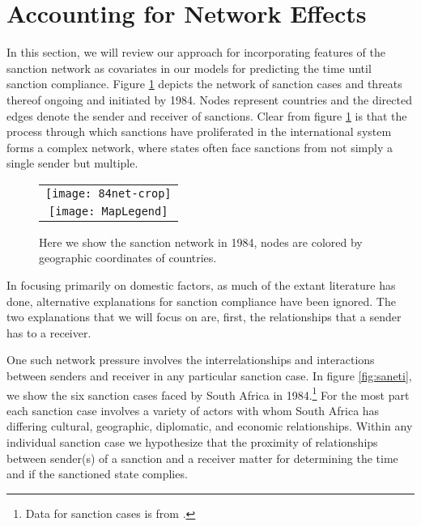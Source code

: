 
\section*{Accounting for Network Effects}
\label{neteffects}

In this section, we will review our approach for incorporating features of the sanction network as covariates in our models for predicting the time until sanction compliance. Figure \ref{fig:spaghetti} depicts the network of sanction cases and threats thereof ongoing and initiated by 1984. Nodes represent countries and the directed edges denote the sender and receiver of sanctions. Clear from figure \ref{fig:spaghetti} is that the process through which sanctions have proliferated in the international system forms a complex network, where states often face sanctions from not simply a single sender but multiple. 

\begin{figure}[ht]
  \centering
  \begin{tabular}{c}
	  \texttt{[image: 84net-crop]} \\
	  \texttt{[image: MapLegend]}
  \end{tabular}
  \caption{Here we show the sanction network in 1984, nodes are colored by geographic coordinates of countries.}
  \label{fig:spaghetti}
\end{figure}
\FloatBarrier

In focusing primarily on domestic factors, as much of the extant literature has done, alternative explanations for sanction compliance have been ignored. The two explanations that we will focus on are, first, the relationships that a sender has to a receiver. 

One such network pressure involves the interrelationships and interactions between senders and receiver in any particular sanction case. In figure \ref{fig:saneti}, we show the six sanction cases faced by South Africa in 1984.\footnote{Data for sanction cases is from \citet{morgan2009threat}.} For the most part each sanction case involves a variety of actors with whom South Africa has differing cultural, geographic, diplomatic, and economic relationships. Within any individual sanction case we hypothesize that the proximity of relationships between sender(s) of a sanction and a receiver matter for determining the time and if the sanctioned state complies. 

